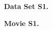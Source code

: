 \documentclass[draft,jgrga]{agutexSI2019}
\begin{document}
\begin{article}

\noindent\textbf{Data Set S1.} %


\noindent\textbf{Movie S1.} %


%
%



%
% 

\end{article}
\clearpage

\end{document}
